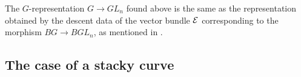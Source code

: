 
\begin{rmk}
The $G$-representation $G \to GL_n$ found above is the same as the representation obtained by the descent data of the vector bundle $\mathcal{E}$ corresponding to the morphism $BG \to BGL_n$, as mentioned in .
\end{rmk}


\subsection{The case of a stacky curve} \label{subsection: the case of a stacky curve}


